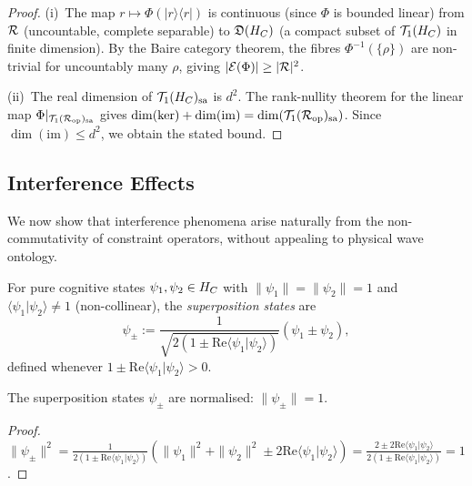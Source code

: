 \begin{proof}
(i)~The map $r \mapsto \Phi(|r\rangle\langle r|)$ is continuous
(since $\Phi$ is bounded linear) from $\mathcal{R}$ (uncountable, complete
separable) to $\mathfrak{D}(H_C)$ (a compact subset of
$\mathcal{T}_1(H_C)$ in finite dimension).  By the Baire category
theorem, the fibres $\Phi^{-1}(\{\rho\})$ are non-trivial for
uncountably many $\rho$, giving $|\mathcal{E}(\Phi)| \geq |\mathcal{R}|^2$.

(ii)~The real dimension of $\mathcal{T}_1(H_C)_{\mathrm{sa}}$ is
$d^2$.  The rank-nullity theorem for the linear map
$\Phi|_{\mathcal{T}_1(\mathcal{R}_{\mathrm{op}})_{\mathrm{sa}}}$
gives $\dim(\mathrm{ker}) + \dim(\mathrm{im}) =
\dim(\mathcal{T}_1(\mathcal{R}_{\mathrm{op}})_{\mathrm{sa}})$.
Since $\dim(\mathrm{im}) \leq d^2$, we obtain the stated bound.
\end{proof}

\subsection{Interference Effects}
\label{sec:ch8:interference}

We now show that interference phenomena arise naturally from the
non-commutativity of constraint operators, without appealing to
physical wave ontology.

\begin{definition}
\label{def:8.12}
For pure cognitive states $\psi_1, \psi_2 \in H_C$ with
$\|\psi_1\| = \|\psi_2\| = 1$ and
$\langle\psi_1|\psi_2\rangle \neq 1$ (non-collinear), the
\emph{superposition states} are
\[
  \psi_\pm := \frac{1}{\sqrt{2(1 \pm \mathrm{Re}\langle\psi_1|\psi_2\rangle)}}
  (\psi_1 \pm \psi_2),
\]
defined whenever $1 \pm \mathrm{Re}\langle\psi_1|\psi_2\rangle > 0$.
\end{definition}

\begin{lemma}
\label{lem:8.6}
The superposition states $\psi_\pm$ are normalised:
$\|\psi_\pm\| = 1$.
\end{lemma}

\begin{proof}
$\|\psi_\pm\|^2 = \frac{1}{2(1 \pm \mathrm{Re}\langle\psi_1|\psi_2\rangle)}
(\|\psi_1\|^2 + \|\psi_2\|^2 \pm 2\mathrm{Re}\langle\psi_1|\psi_2\rangle)
= \frac{2 \pm 2\mathrm{Re}\langle\psi_1|\psi_2\rangle}{2(1 \pm
\mathrm{Re}\langle\psi_1|\psi_2\rangle)} = 1$.
\end{proof}

